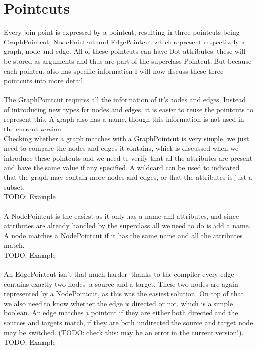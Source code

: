 \documentclass[a4paper]{report}
\begin{document}
\section{Pointcuts}
Every join point is expressed by a pointcut, resulting in three pointcuts being GraphPointcut, NodePointcut and EdgePointcut which represent respectively a graph, node and edge. All of these pointcuts can have Dot attributes, these will be stored as arguments and thus are part of the superclass Pointcut. But because each pointcut also has specific information I will now discuss these three pointcuts into more detail.\\
\\
The GraphPointcut requires all the information of it's nodes and edges. Instead of introducing new types for nodes and edges, it is easier to reuse the pointcuts to represent this. A graph also has a name, though this information is not used in the current version.\\
Checking whether a graph matches with a GraphPointcut is very simple, we just need to compare the nodes and edges it contains, which is discussed when we introduce these pointcuts and we need to verify that all the attributes are present and have the same value if any specified. A wildcard can be used to indicated that the graph may contain more nodes and edges, or that the attributes is just a subset.\\
TODO: Example\\
\\
A NodePointcut is the easiest as it only has a name and attributes, and since attributes are already handled by the superclass all we need to do is add a name. A node matches a NodePointcut if it has the same name and all the attributes match.\\
TODO: Example\\
\\
An EdgePointcut isn't that much harder, thanks to the compiler every edge contains exactly two nodes: a source and a target. These two nodes are again represented by a NodePointcut, as this was the easiest solution. On top of that we also need to know whether the edge is directed or not, which is a simple boolean. An edge matches a pointcut if they are either both directed and the sources and targets match, if they are both undirected the source and target node may be switched. (TODO: check this: may be an error in the current version!).\\
TODO: Example\\
\end{document}
